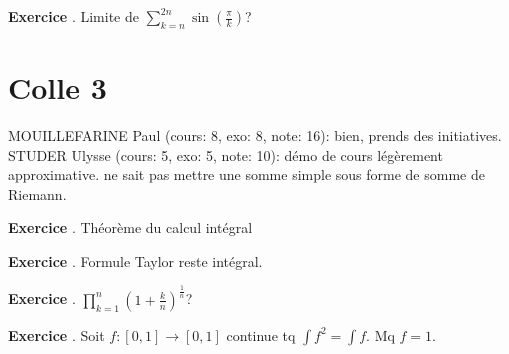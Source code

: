 \documentclass[10pt,a4paper]{article}
\newcounter{question}
\newcounter{exo}
\newenvironment{exo}{\vspace{0.5cm}\setcounter{question}{0}\addtocounter{exo}{1} \noindent \textbf{Exercice \theexo}. \normalsize }{\par}
\begin{document}
	\begin{exo}
		Limite de $\sum_{k=n}^{2n} \sin(\frac{\pi}{k})$?
	\end{exo}

	\section*{Colle 3}
	\setcounter{exo}{0}
	MOUILLEFARINE Paul (cours: 8, exo:  8, note: 16): bien, prends des initiatives.\\
	STUDER Ulysse (cours: 5, exo: 5, note: 10): démo de cours légèrement approximative. ne sait pas mettre une somme simple sous forme de somme de Riemann.\\
	
	\begin{exo}
		Théorème du calcul intégral
	\end{exo}		
	
	\begin{exo}
		Formule Taylor reste intégral.
	\end{exo}

	\begin{exo}
		$\prod_{k=1}^{n} (1+\frac{k}{n})^{\frac{1}{n}}$?
	\end{exo}
	
	\begin{exo}
	Soit $f : [0,1] \longrightarrow [0, 1]$ continue tq $\int f^2 = \int f$. Mq $f = 1$.
	\end{exo}
	
\end{document}

